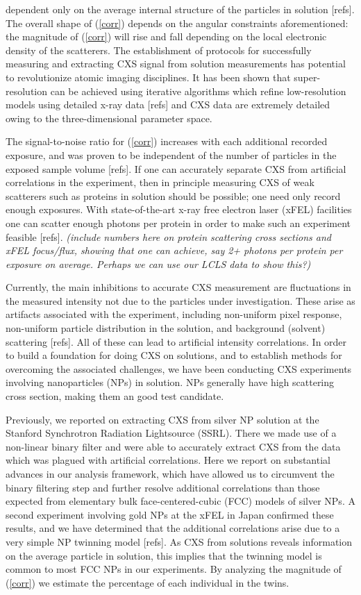 \documentclass [11pt,fleqn]{article}
\begin{document}
dependent only on the average internal structure of the particles in solution [refs]. The overall shape of (\ref{corr}) depends on the angular constraints aforementioned: the magnitude of (\ref{corr}) will rise and fall depending on the local electronic density of the scatterers. The establishment of protocols for successfully measuring and extracting CXS signal from solution measurements has potential to revolutionize atomic imaging disciplines. It has been shown that super-resolution can be achieved using iterative algorithms which refine low-resolution models using detailed x-ray data [refs] and CXS data are extremely detailed owing to the three-dimensional parameter space. 

The signal-to-noise ratio for (\ref{corr}) increases with each additional recorded exposure, and was proven to be independent of the number of particles in the exposed sample volume [refs]. If one can accurately separate CXS from artificial correlations in the experiment, then in principle measuring CXS of weak scatterers such as proteins in solution should be possible; one need only record enough exposures. With state-of-the-art x-ray free electron laser (xFEL) facilities one can scatter enough photons per protein in order to make such an experiment feasible [refs]. \emph{(include numbers here on protein scattering cross sections and xFEL focus/flux, showing that one can achieve, say 2+ photons per protein per exposure on average. Perhaps we can use our LCLS data to show this?)}

Currently, the main inhibitions to accurate CXS measurement are fluctuations in the measured intensity not due to the particles under investigation. These arise as artifacts associated with the experiment, including non-uniform pixel response, non-uniform particle distribution in the solution, and background (solvent) scattering [refs]. All of these can lead to artificial intensity correlations. In order to build a foundation for doing CXS on solutions, and to establish methods for overcoming the associated challenges, we have been conducting CXS experiments involving nanoparticles (NPs) in solution. NPs generally have high scattering cross section, making them an good test candidate.

Previously, we reported on extracting CXS from silver NP solution at the Stanford Synchrotron Radiation Lightsource (SSRL). There we made use of a non-linear binary filter and were able to accurately extract CXS from the data which was plagued with artificial correlations. Here we report on substantial advances in our analysis framework, which have allowed us to circumvent the binary filtering step and further resolve additional correlations than those expected from elementary bulk face-centered-cubic (FCC) models of silver NPs. A second experiment involving gold NPs at the xFEL in Japan  confirmed these results, and we have determined that the additional correlations arise due to a very simple NP twinning model [refs]. As CXS from solutions reveals information on the average particle in solution, this implies that the twinning model is common to most FCC NPs in our experiments. By analyzing the magnitude of (\ref{corr}) we estimate the percentage of each individual in the twins.
\end{document}
